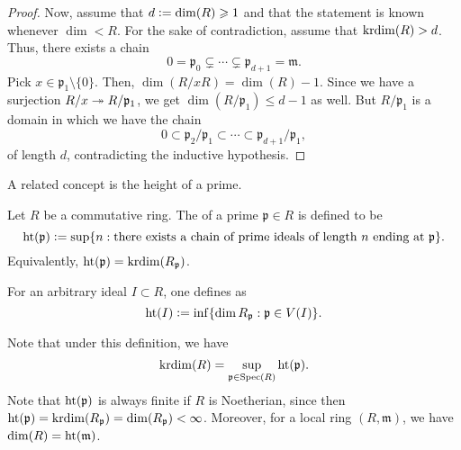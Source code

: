 \documentclass[12pt]{article}
\begin{document}
\begin{proof}
	Now, assume that $d \vcentcolon= \dim(R) \ge 1$ and that the statement is known whenever $\dim < R$. \newline
	For the sake of contradiction, assume that $\krdim(R) > d$. Thus, there exists a chain
	\begin{equation*} 
		0 = \mathfrak{p}_{0} \subsetneq \cdots \subsetneq \mathfrak{p}_{d + 1} = \mathfrak{m}.
	\end{equation*}
	Pick $x \in \mathfrak{p}_{1} \setminus \{0\}$. Then, $\dim(R/xR) = \dim(R) - 1$. Since we have a surjection $R/x \onto R/\mathfrak{p}_{1}$, we get $\dim(R/\mathfrak{p}_{1}) \le d - 1$ as well. \newline
	But $R/\mathfrak{p}_{1}$ is a domain in which we have the chain
	\begin{equation*} 
		0 \subset \mathfrak{p}_{2}/\mathfrak{p}_{1} \subset \cdots \subset \mathfrak{p}_{d + 1}/\mathfrak{p}_{1},
	\end{equation*}
	of length $d$, contradicting the inductive hypothesis.
\end{proof}

A related concept is the height of a prime.

\begin{defn}
	Let $R$ be a commutative ring. The  of a prime $\mathfrak{p} \in R$ is defined to be 
	\begin{equation*} 
		\htt(\mathfrak{p}) \vcentcolon= \sup\{n : \text{there exists a chain of prime ideals of length $n$ ending at $\mathfrak{p}$}\}.
	\end{equation*}
	Equivalently, $\htt(\mathfrak{p}) = \krdim(R_{\mathfrak{p}})$.

	For an arbitrary ideal $I \subset R$, one defines  as
	\begin{equation*} 
		\htt(I) \vcentcolon= \inf \{\dim R_{\mathfrak{p}} : \mathfrak{p} \in V(I)\}.
	\end{equation*}
\end{defn}

Note that under this definition, we have
\begin{equation*} 
	\krdim(R) = \sup_{\mathfrak{p} \in \Spec(R)} \htt(\mathfrak{p}).
\end{equation*}
Note that $\htt(\mathfrak{p})$ is always finite if $R$ is Noetherian, since then $\htt(\mathfrak{p}) = \krdim(R_{\mathfrak{p}}) = \dim(R_{\mathfrak{p}}) < \infty$. \newline
Moreover, for a local ring $(R, \mathfrak{m})$, we have $\dim(R) = \htt(\mathfrak{m})$.
\end{document}
